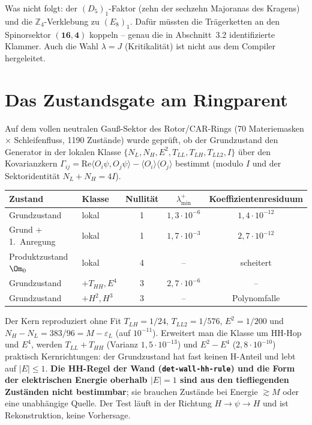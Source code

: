 Was nicht folgt: der $(D_5)_1$-Faktor (zehn der sechzehn Majoranas des Kragens) und die $\mathbb Z_4$-Verklebung zu $(E_8)_1$. Dafür müssten die Trägerketten an den Spinorsektor $(\mathbf{16},\mathbf 4)$ koppeln -- genau die in Abschnitt~3.2 identifizierte Klammer. Auch die Wahl $\lambda=J$ (Kritikalität) ist nicht aus dem Compiler hergeleitet.

\section{Das Zustandsgate am Ringparent}
Auf dem vollen neutralen Gauß-Sektor des Rotor/CAR-Rings (70 Materiemasken $\times$ Schleifenfluss, 1190 Zustände) wurde geprüft, ob der Grundzustand den Generator in der lokalen Klasse $\{N_L,N_H,E^2,T_{LL},T_{LH},T_{LL2},I\}$ über den Kovarianzkern $\Gamma_{ij}=\mathrm{Re}\langle O_i\psi,O_j\psi\rangle-\langle O_i\rangle\langle O_j\rangle$ bestimmt (modulo $I$ und der Sektoridentität $N_L+N_H=4I$).

\begin{center}
\begin{tabular}{@{}llccc@{}}\toprule
Zustand & Klasse & Nullität & $\lambda_{\min}^+$ & Koeffizientenresiduum\\\midrule
Grundzustand & lokal & 1 & $1{,}3\cdot10^{-6}$ & $1{,}4\cdot10^{-12}$\\
Grund + 1.\ Anregung & lokal & 1 & $1{,}7\cdot10^{-3}$ & $2{,}7\cdot10^{-12}$\\
Produktzustand $\Om_0$ & lokal & 4 & -- & scheitert\\
Grundzustand & $+T_{HH},E^4$ & 3 & $2{,}7\cdot10^{-6}$ & --\\
Grundzustand & $+H^2,H^3$ & 3 & -- & Polynomfalle\\\bottomrule
\end{tabular}
\end{center}
Der Kern reproduziert ohne Fit $T_{LH}=1/24$, $T_{LL2}=1/576$, $E^2=1/200$ und $N_H-N_L=383/96=M-\varepsilon_L$ (auf $10^{-11}$). Erweitert man die Klasse um HH-Hop und $E^4$, werden $T_{LL}+T_{HH}$ (Varianz $1{,}5\cdot10^{-13}$) und $E^2-E^4$ ($2{,}8\cdot10^{-10}$) praktisch Kernrichtungen: der Grundzustand hat fast keinen H-Anteil und lebt auf $|E|\le1$. \textbf{Die HH-Regel der Wand (\texttt{det-wall-hh-rule}) und die Form der elektrischen Energie oberhalb $|E|=1$ sind aus den tiefliegenden Zuständen nicht bestimmbar}; sie brauchen Zustände bei Energie $\gtrsim M$ oder eine unabhängige Quelle. Der Test läuft in der Richtung $H\to\psi\to H$ und ist Rekonstruktion, keine Vorhersage.

